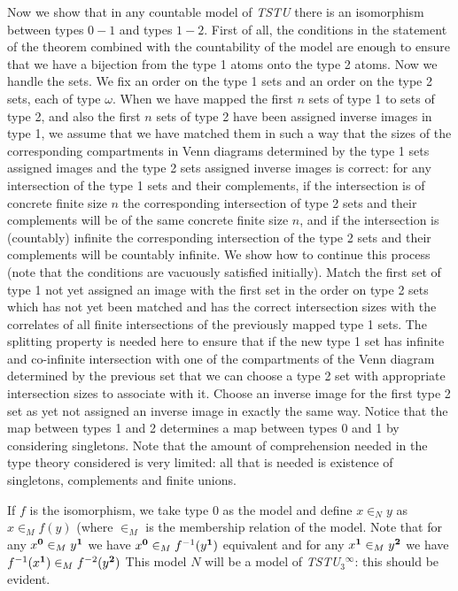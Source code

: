 \documentclass[12pt]{book}
\begin{document}
\begin{description}
Now we show that in any countable model of {\em TSTU\/} there is an
isomorphism between types $0-1$ and types $1-2$.  First of all, the
conditions in the statement of the theorem combined with the
countability of the model are enough to ensure that we have a
bijection from the type 1 atoms onto the type 2 atoms.  Now we handle
the sets.  We fix an order on the type 1 sets and an order on the type
2 sets, each of type $\omega$.  When we have mapped the first $n$ sets
of type 1 to sets of type 2, and also the first $n$ sets of type 2
have been assigned inverse images in type 1, we assume that we have
matched them in such a way that the sizes of the corresponding
compartments in Venn diagrams determined by the type 1 sets assigned
images and the type 2 sets assigned inverse images is correct: for any
intersection of the type 1 sets and their complements, if the
intersection is of concrete finite size $n$ the corresponding
intersection of type 2 sets and their complements will be of the same
concrete finite size $n$, and if the intersection is (countably)
infinite the corresponding intersection of the type 2 sets and their
complements will be countably infinite.  We show how to continue this
process (note that the conditions are vacuously satisfied initially).
Match the first set of type 1 not yet assigned an image with the first
set in the order on type 2 sets which has not yet been matched and has
the correct intersection sizes with the correlates of all finite
intersections of the previously mapped type 1 sets.  The splitting
property is needed here to ensure that if the new type 1 set has
infinite and co-infinite intersection with one of the compartments of
the Venn diagram determined by the previous set that we can choose a
type 2 set with appropriate intersection sizes to associate with it.
Choose an inverse image for the first type 2 set as yet not assigned
an inverse image in exactly the same way.  Notice that the map between
types 1 and 2 determines a map between types 0 and 1 by considering
singletons.  Note that the amount of comprehension needed in the type
theory considered is very limited: all that is needed is existence of
singletons, complements and finite unions.

If $f$ is the isomorphism, we take type 0 as the model and define $x
\in_N y$ as $x \in_M f(y)$ (where $\in_M$ is the membership relation
of the model.  Note that for any $x^{\bf 0} \in_M y^{\bf 1}$ we have
$x^{\bf 0} \in_M f^{-1}(y^{\bf 1})$ equivalent and for any $x^{\bf 1}
\in_M y^{\bf 2}$ we have $f^{-1}(x^{\bf 1}) \in_M f^{-2}(y^{\bf 2})$
This model $N$ will be a model of {\em TSTU$_3$\/}$^{\infty}$: this
should be evident.


\end{description}
\end{document}
